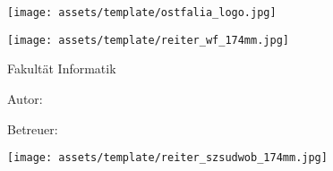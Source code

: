 \frontmatter
\begin{titlepage}
	\thispagestyle{titlepage}
	
	\hfill
	\texttt{[image: assets/template/ostfalia\_logo.jpg]}
	
	\texttt{[image: assets/template/reiter\_wf\_174mm.jpg]}
	
	\hspace{1cm}
	\begin{minipage}{\dimexpr\textwidth-1.5cm\relax}
		{\Large\textsf{Fakultät Informatik}}
	\end{minipage}
	
	\vfil
	

	\hspace{1cm}
	\begin{minipage}{\dimexpr\textwidth-1.5cm\relax}
		\hrulefill
		
		\vspace{2em}
		
		{\Large\textbf{\textsf{\documentsubject}}}
			
		\vspace{2em}
			
		{\Huge\textbf{\textsf{\documenttitle}}}
			
		\vspace{2em}
			
		{\Large\textsf{\documentsubtitle}}
		
		\vspace{1em}
		
		\hrulefill
	\end{minipage}	


	\vfil
	
	\hspace{1cm}
	\begin{minipage}{\dimexpr\textwidth-1.5cm\relax}
		{\Large\textsf{Autor: \documentauthor}}
		
		\vspace{0.5cm}		
		
		{\Large\textsf{Betreuer: \documenttutor}}
	\end{minipage}
	
	\vspace{2em}
	
	
	\enlargethispage{10\baselineskip}
	
	\texttt{[image: assets/template/reiter\_szsudwob\_174mm.jpg]}
\end{titlepage}

\restoregeometry

